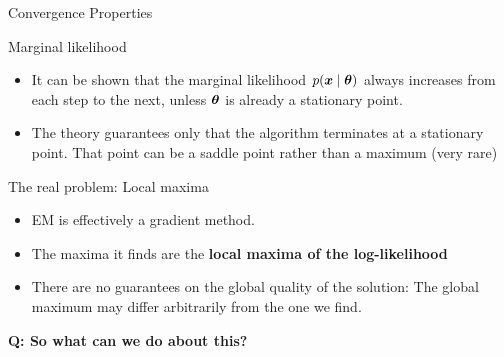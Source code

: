 \documentclass[10pt]{beamer}
\begin{document}
\begin{frame}{Convergence Properties}
\footnotesize
\begin{sblock}{Marginal likelihood}
\begin{itemize}
\item It can be shown that the marginal likelihood $p({\boldsymbol x} \; | \; {\boldsymbol \theta})$ always increases from each step to the next, unless ${\boldsymbol \theta}$ is already a stationary point.
\item The theory guarantees only that the algorithm terminates at a stationary point.  That point can be a saddle point rather than a maximum (very rare)

\end{itemize}
\end{sblock}
\begin{sblock}{The real problem: Local maxima}
\begin{minipage}{.6\textwidth}
\begin{itemize}
\item EM is effectively a gradient method.
\item The maxima it finds are the \bf{local maxima of the log-likelihood}
\item There are no guarantees on the global quality of the solution: The global maximum may differ arbitrarily from the one we find.
\end{itemize}
\end{minipage}
\hfill
\begin{minipage}{.35\textwidth}
\end{minipage}

\end{sblock}
\vfill \tiny \bf{Q:} So what can we do about this?
\end{frame}
\end{document}
